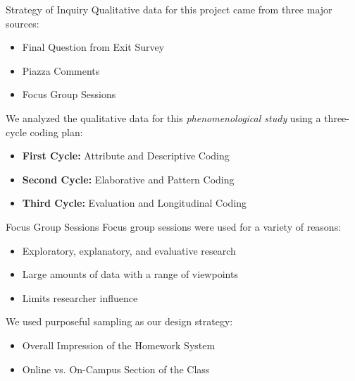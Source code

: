 \documentclass[xcolor=x11names,compress]{beamer}
\begin{document}
\begin{frame}{Strategy of Inquiry}
	Qualitative data for this project came from three major sources:
	\vspace{1mm}
	\begin{itemize}
		\item Final Question from Exit Survey
		\item Piazza Comments
		\item Focus Group Sessions
	\end{itemize}
	\vspace{5mm}
	We analyzed the qualitative data for this \textit{phenomenological study} using a three-cycle coding plan:
	\vspace{1mm}
	\begin{itemize}
		\item \textbf{First Cycle:} Attribute and Descriptive Coding
		\item \textbf{Second Cycle:} Elaborative and Pattern Coding
		\item \textbf{Third Cycle:} Evaluation and Longitudinal Coding
	\end{itemize}
\end{frame}

\begin{frame}{Focus Group Sessions}
	Focus group sessions were used for a variety of reasons:
	\vspace{1mm}
	\begin{itemize}
		\item Exploratory, explanatory, and evaluative research
		\item Large amounts of data with a range of viewpoints
		\item Limits researcher influence
	\end{itemize}
	\vspace{5mm}
	We used purposeful sampling as our design strategy:
	\vspace{1mm}
	\begin{itemize}
		\item Overall Impression of the Homework System
		\item Online vs. On-Campus Section of the Class
	\end{itemize}
\end{frame}
\end{document}
